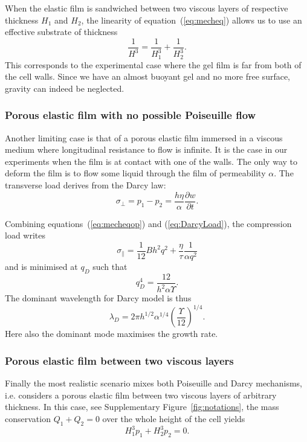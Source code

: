 \documentclass[twocolumn,superscriptaddress,showpacs,preprintnumbers,
amsmath,amssymb,prl]{revtex4-1}
\begin{document}
When the elastic film is sandwiched between two viscous layers of respective thickness $H_1$ and $H_2$, the linearity of equation~(\ref{eq:mecheq}) allows us to use an effective substrate of thickness 
\begin{equation}
\frac{1}{H^3} = \frac{1}{H_1^3}+\frac{1}{H_2^3}.
\end{equation}
This corresponds to the experimental case where the gel film is far from both of the cell walls. Since we have an almost buoyant gel and no more free surface, gravity can indeed be neglected.

\subsubsection*{Porous elastic film with no possible Poiseuille flow}
Another limiting case is that of a porous elastic film immersed in a viscous medium where longitudinal resistance to flow is infinite. It is the case in our experiments when the film is at contact with one of the walls. The only way to deform the film is to flow some liquid through the film of permeability $\alpha$. The transverse load derives from the Darcy law:
\begin{equation}
\sigma_\perp = p_1-p_2 = \frac{h\eta}{\alpha}\frac{\partial w}{\partial t}.
\label{eq:DarcyLoad}
\end{equation}

Combining equations~(\ref{eq:mecheqop}) and (\ref{eq:DarcyLoad}), the compression load writes
\begin{equation}
\sigma_\parallel = \frac{1}{12}B h^2 q^2 + \frac{\eta}{\tau}\frac{1}{\alpha q^2}
\label{eq:sigma0D}
\end{equation}
and is minimised at $q_D$ such that
\begin{equation}
q_D^4 = \frac{12}{h^2\alpha\Upsilon}.
\label{eq:qD}
\end{equation}
%
The dominant wavelength for Darcy model is thus
\begin{equation}
\lambda_D = 2\pi h^{1/2}\alpha^{1/4}\left(\frac{\Upsilon}{12}\right)^{1/4}.
\end{equation}
Here also the dominant mode maximises the growth rate.


\subsubsection*{Porous elastic film between two viscous layers}
Finally the most realistic scenario mixes both Poiseuille and Darcy mechanisms, i.e. considers a porous elastic film between two viscous layers of arbitrary thickness. In this case, see Supplementary Figure~\ref{fig:notations}, the mass conservation $Q_1 + Q_2 = 0$ over the whole height of the cell yields
\begin{equation}
H_1^3 p_1 + H_2^3 p_2 = 0.
\label{eq:pressures}
\end{equation}
\end{document}
